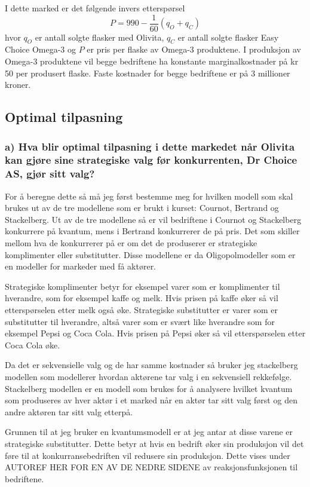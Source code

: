 \documentclass[
  12pt,
  a4paper,
  DIV=11,
  numbers=noendperiod]{scrartcl}
\begin{document}
I dette marked er det følgende invers etterspørsel \[
P = 990 - \frac{1}{60}(q_O + q_C)
\] hvor \(q_O\) er antall solgte flasker med Olivita, \(q_C\) er antall
solgte flasker Easy Choice Omega-3 og \(P\) er pris per flaske av
Omega-3 produktene. I produksjon av Omega-3 produktene vil begge
bedriftene ha konstante marginalkostnader på kr 50 per produsert flaske.
Faste kostnader for begge bedriftene er på 3 millioner kroner.

\subsection{Optimal tilpasning}\label{optimal-tilpasning}

\subsubsection{a) Hva blir optimal tilpasning i dette markedet når Olivita kan gjøre sine strategiske valg før konkurrenten, Dr Choice AS, gjør sitt valg?}\label{a-hva-blir-optimal-tilpasning-i-dette-markedet-nuxe5r-olivita-kan-gjuxf8re-sine-strategiske-valg-fuxf8r}

For å beregne dette så må jeg først bestemme meg for hvilken modell som
skal brukes ut av de tre modellene som er brukt i kurset: Cournot,
Bertrand og Stackelberg. Ut av de tre modellene så er vil bedriftene i
Cournot og Stackelberg konkurrere på kvantum, mens i Bertrand
konkurrerer de på pris. Det som skiller mellom hva de konkurrerer på er
om det de produserer er strategiske komplimenter eller substitutter.
Disse modellene er da Oligopolmodeller som er en modeller for markeder
med få aktører.

Strategiske komplimenter betyr for eksempel varer som er komplimenter
til hverandre, som for eksempel kaffe og melk. Hvis prisen på kaffe øker
så vil etterspørselen etter melk også øke. Strategiske substitutter er
varer som er substitutter til hverandre, altså varer som er svært like
hverandre som for eksempel Pepsi og Coca Cola. Hvis prisen på Pepsi øker
så vil etterspørselen etter Coca Cola øke.

Da det er sekvensielle valg og de har samme kostnader så bruker jeg
stackelberg modellen som modellerer hvordan aktørene tar valg i en
sekvensiell rekkefølge. Stackelberg modellen er en modell som brukes for
å analysere hvilket kvantum som produseres av hver aktør i et marked når
en aktør tar sitt valg først og den andre aktøren tar sitt valg etterpå.

Grunnen til at jeg bruker en kvantumsmodell er at jeg antar at disse
varene er strategiske substitutter. Dette betyr at hvis en bedrift øker
sin produksjon vil det føre til at konkurransebedriften vil redusere sin
produksjon. Dette vises under AUTOREF HER FOR EN AV DE NEDRE SIDENE av
reaksjonsfunksjonen til bedriftene.
\end{document}
